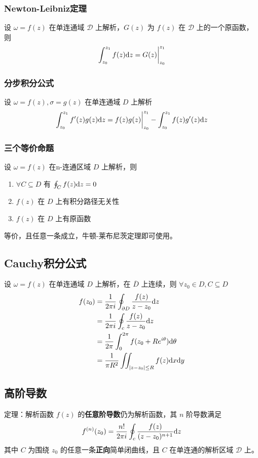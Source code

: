 \documentclass[./main.tex]{subfiles}
\begin{document}
\subsubsection{Newton-Leibniz定理}
设 $\omega=f(z)$ 在单连通域 $\mathscr{D}$ 上解析，$G(z)$ 为 $f(z)$ 在 $\mathscr{D}$ 上的一个原函数，则
\begin{equation}
    \int_{z_0}^{z_1}f(z)\text{d}z=G(z)\bigg|_{z_0}^{z_1}
\end{equation}
\subsubsection{分步积分公式}
设 $\omega=f(z),\sigma=g(z)$ 在单连通域 $D$ 上解析
\begin{equation}
    \int_{z_0}^{z_1}f'(z)g(z)\text{d}z=f(z)g(z)\bigg|_{z_0}^{z_1}-\int_{z_0}^{z_1}f(z)g'(z)\text{d}z
\end{equation}
\subsubsection{三个等价命题}
设 $\omega=f(z)$ 在n-连通区域 $D$ 上解析，则
\begin{enumerate}[(1)]
    \item $\forall C\subseteq D$ 有 $\oint_Cf(z)\text{d}z=0$
    \item $f(z)$ 在 $D$ 上有积分路径无关性
    \item $f(z)$ 在 $D$ 上有原函数
\end{enumerate}
等价，且任意一条成立，牛顿-莱布尼茨定理即可使用。
\subsection{Cauchy积分公式}
设 $\omega=f(z)$ 在单连通域 $D$ 上解析，在 $\overline{D}$ 上连续，则 $\forall z_0\in D,C\subseteq D$
\begin{align}
    f(z_0)&=\frac{1}{2\pi i}\oint_{\partial D}\frac{f(z)}{z-z_0}\text{d}z\\
    &=\frac{1}{2\pi i}\oint_c\frac{f(z)}{z-z_0}\text{d}z\\&=\frac{1}{2\pi}\int_0^{2\pi}f(z_0+Re^{i\theta})\text{d}\theta\\&=\frac{1}{\pi R^2}\iint_{|z-z_0|\le R}f(z)\text{d}x\text{d}y
\end{align}
\subsection{高阶导数}
定理：解析函数 $f(z)$ 的\textbf{任意阶导数}仍为解析函数，其 $n$ 阶导数满足
\begin{equation}\label{thm:gjds}
    f^{(n)}(z_0)=\frac{n!}{2\pi i}\oint_c\frac{f(z)}{(z-z_0)^{n+1}}\text{d}z
\end{equation}
其中 $C$ 为围绕 $z_0$ 的任意一条\textbf{正向}简单闭曲线，且 $C$ 在单连通的解析区域 $\mathscr{D}$ 上。
\end{document}
